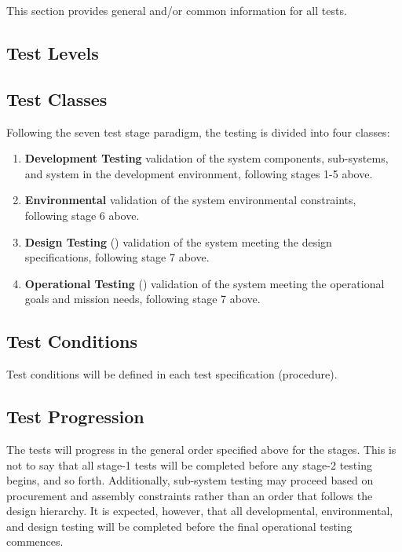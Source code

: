 


This section provides general and/or common information for all tests.

\subsection{Test Levels}
\label{loc:TestLevels}



\subsection{Test Classes}
\label{loc:TestClasses}

Following the seven test stage paradigm, the testing is divided into four classes:
\begin{enumerate}[itemindent=5pt,topsep=0pt,itemsep=0pt,partopsep=0pt, parsep=0pt]
	\item {\bf Development Testing} validation of the system components, sub-systems, and system in the development environment, following stages 1-5 above.
	\item {\bf Environmental} validation of the system environmental constraints, following stage 6 above.
	\item {\bf Design Testing} (\StageDT) validation of the system meeting the design specifications, following stage 7 above.
	\item {\bf Operational Testing} (\StageOT) validation of the system meeting the operational goals and mission needs, following stage 7 above.
\end{enumerate}

\subsection{Test Conditions}
\label{loc:TestConditions}

Test conditions will be defined in each test specification (procedure).


\subsection{Test Progression}
\label{loc:TestProgression}

The tests will progress in the general order specified above for the stages.
This is not to say that all stage-1 tests will be completed before any stage-2 testing begins, and so forth.
Additionally, sub-system testing may proceed based on procurement and assembly constraints rather than an order that follows the design hierarchy.
It is expected, however, that all developmental, environmental, and design testing will be completed before the final operational testing commences.

